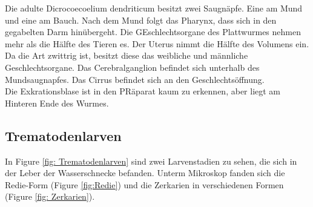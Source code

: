 \documentclass[oneside,10pt,a4paper]{report}
\begin{document}
				Die adulte Dicrocoecoelium dendriticum besitzt zwei Saugnäpfe. Eine am Mund und eine am Bauch. Nach dem Mund folgt das Pharynx, dass sich in den gegabelten Darm hinübergeht. Die GEschlechtsorgane des Plattwurmes nehmen mehr als die Hälfte des Tieren es. Der Uterus nimmt die Hälfte des Volumens ein. Da die Art zwittrig ist, besitzt diese das weibliche und männliche Geschlechtsorgane. Das Cerebralganglion befindet sich unterhalb des Mundsaugnapfes. Das Cirrus befindet sich an den Geschlechtsöffnung.\\
				Die Exkrationsblase ist in den PRäparat kaum zu erkennen, aber liegt am Hinteren Ende des Wurmes.
				
			\subsection{Trematodenlarven}
				In Figure \ref{fig: Trematodenlarven} sind zwei Larvenstadien zu sehen, die sich in der Leber der Wasserschnecke befanden. Unterm Mikroskop fanden sich die Redie-Form (Figure \ref{fig:Redie}) und die Zerkarien in verschiedenen Formen (Figure \ref{fig: Zerkarien}).
				
\end{document}
